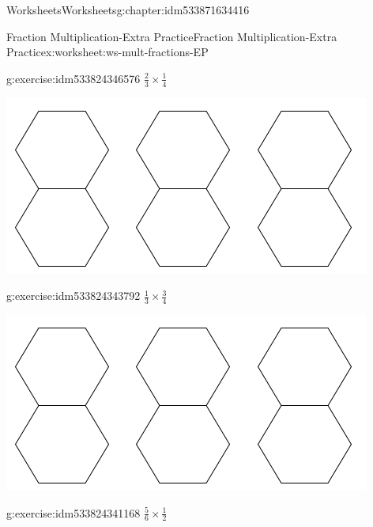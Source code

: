 \documentclass[twoside,11pt,]{book}
\begin{document}
\begin{chapterptx}{Worksheets}{}{Worksheets}{}{}{g:chapter:idm533871634416}
\begin{worksheet-section-numberless}{Fraction Multiplication-Extra Practice}{}{Fraction Multiplication-Extra Practice}{}{}{x:worksheet:ws-mult-fractions-EP}
\begin{introduction}{}
\end{introduction}%
\begin{divisionexercise}{3}{}{}{g:exercise:idm533824346576}%
\(\frac{2}{3} \times \frac{1}{4} \)%
\begin{sidebyside}{1}{0.1}{0.1}{0}%
\begin{sbspanel}{0.8}%
\includegraphics[width=1\linewidth]{images/3-double-hexagons.png}
\end{sbspanel}%
\end{sidebyside}%
\end{divisionexercise}%
\clearpage
\begin{divisionexercise}{4}{}{}{g:exercise:idm533824343792}%
\(\frac{1}{3} \times \frac{3}{4} \)%
\begin{sidebyside}{1}{0.1}{0.1}{0}%
\begin{sbspanel}{0.8}%
\includegraphics[width=1\linewidth]{images/3-double-hexagons.png}
\end{sbspanel}%
\end{sidebyside}%
\end{divisionexercise}%
\begin{divisionexercise}{5}{}{}{g:exercise:idm533824341168}%
\(\frac{5}{6} \times \frac{1}{2} \)%
\begin{sidebyside}{1}{0.1}{0.1}{0}%
\begin{sbspanel}{0.8}%

\end{sbspanel}
\end{sidebyside}
\end{divisionexercise}
\end{worksheet-section-numberless}
\end{chapterptx}
\end{document}
